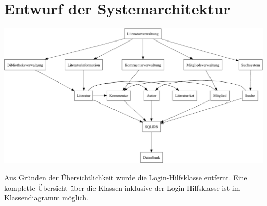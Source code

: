 \section{Entwurf der Systemarchitektur} 
\includegraphics[scale=0.56]{systemarchitektur}

Aus Gründen der Übersichtlichkeit wurde die Login-Hilfsklasse entfernt. Eine komplette Übersicht über die Klassen inklusive der Login-Hilfsklasse ist im Klassendiagramm möglich.
\clearpage